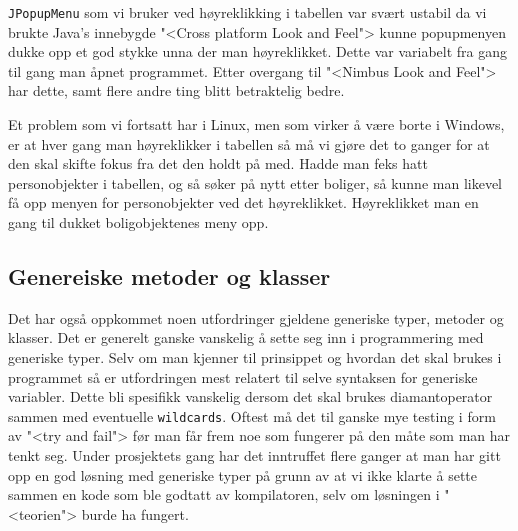\texttt{JPopupMenu} som vi bruker ved høyreklikking i tabellen var svært ustabil da vi brukte Java's innebygde "<Cross platform Look and Feel"> kunne popupmenyen dukke opp et god stykke unna der man høyreklikket. Dette var variabelt fra gang til gang man åpnet programmet. Etter overgang til "<Nimbus Look and Feel"> har dette, samt flere andre ting blitt betraktelig bedre.

Et problem som vi fortsatt har i Linux, men som virker å være borte i Windows, er at hver gang man høyreklikker i tabellen så må vi gjøre det to ganger for at den skal skifte fokus fra det den holdt på med. Hadde man feks hatt personobjekter i tabellen, og så søker på nytt etter boliger, så kunne man likevel få opp menyen for personobjekter ved det høyreklikket. Høyreklikket man en gang til dukket boligobjektenes meny opp.

\subsection{Genereiske metoder og klasser}
Det har også oppkommet noen utfordringer gjeldene generiske typer, metoder og klasser. Det er generelt ganske vanskelig å sette seg inn i programmering med generiske typer. Selv om man kjenner til prinsippet og hvordan det skal brukes i programmet så er utfordringen mest relatert til selve syntaksen for generiske variabler. Dette bli spesifikk vanskelig dersom det skal brukes diamantoperator sammen med eventuelle \texttt{wildcards}. Oftest må det til ganske mye testing i form av "<try and fail"> før man får frem noe som fungerer på den måte som man har tenkt seg. Under prosjektets gang har det inntruffet flere ganger at man har gitt opp en god løsning med generiske typer på grunn av at vi ikke klarte å sette sammen en kode som ble godtatt av kompilatoren, selv om løsningen i "<teorien"> burde ha fungert.